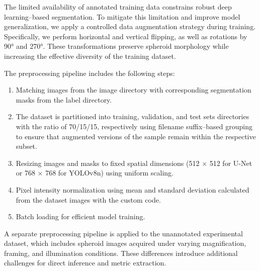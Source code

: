 \documentclass[sigconf, nonacm]{acmart}
\begin{document}

The limited availability of annotated training data constrains robust deep learning–based segmentation. To mitigate this limitation and improve model generalization, we apply a controlled data augmentation strategy during training. Specifically, we perform horizontal and vertical flipping, as well as rotations by 90° and 270°. These transformations preserve spheroid morphology while increasing the effective diversity of the training dataset.

The preprocessing pipeline includes the following steps:
 \begin{enumerate}
 \item Matching images from the image directory with corresponding segmentation masks from the label directory.

\item The dataset is partitioned into training, validation, and test sets directories with the ratio of 70/15/15, respectively using filename suffix–based grouping to ensure that augmented versions of the sample remain within the respective subset.

\item Resizing images and masks to fixed spatial dimensions (512 × 512 for U-Net or 768 × 768 for YOLOv8n) using uniform scaling.

\item Pixel intensity normalization using mean and standard deviation calculated from the dataset images with the custom code.

\item Batch loading for efficient model training.
  
 \end{enumerate}


A separate preprocessing pipeline is applied to the unannotated experimental dataset, which includes spheroid images acquired under varying magnification, framing, and illumination conditions. These differences introduce additional challenges for direct inference and metric extraction.
\end{document}
